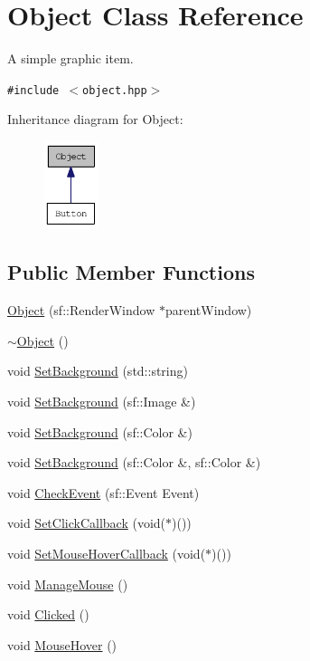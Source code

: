 \hypertarget{classObject}{
\section{Object Class Reference}
\label{classObject}
}
A simple graphic item.  


{\tt \#include $<$object.hpp$>$}

Inheritance diagram for Object:\nopagebreak
\begin{figure}[H]
\begin{center}
\leavevmode
\includegraphics[width=46pt]{classObject__inherit__graph}
\end{center}
\end{figure}
\subsection*{Public Member Functions}
\begin{CompactItemize}
\item 
\hyperlink{classObject_cefe027e1cec4c9de78b851bb42e2e66}{Object} (sf::RenderWindow $\ast$parentWindow)
\item 
\hyperlink{classObject_e8f5483f459e46687bd01e6f9977afd3}{$\sim$Object} ()
\item 
void \hyperlink{classObject_8e374c70b7dbaa03b2a3180490789d1d}{SetBackground} (std::string)
\item 
void \hyperlink{classObject_00d4be2d8b013240b29e50ca7599fe55}{SetBackground} (sf::Image \&)
\item 
void \hyperlink{classObject_aa81f5ed57ee0bca860654241a16e325}{SetBackground} (sf::Color \&)
\item 
void \hyperlink{classObject_1abd4bc0011cb25fe9ed940e554d6cbb}{SetBackground} (sf::Color \&, sf::Color \&)
\item 
void \hyperlink{classObject_b68977125b45e872852613463037cebb}{CheckEvent} (sf::Event Event)
\item 
void \hyperlink{classObject_68e5f5f024cf7f2db43bd2de010c118c}{SetClickCallback} (void($\ast$)())
\item 
void \hyperlink{classObject_82e1ba70ec0e2b9327af29764cd666eb}{SetMouseHoverCallback} (void($\ast$)())
\item 
void \hyperlink{classObject_d353628cfc37903c31e07f9179c7407f}{ManageMouse} ()
\item 
void \hyperlink{classObject_8342d588d9294226206106e142c30e51}{Clicked} ()
\item 
void \hyperlink{classObject_d3669e5b85439868eb7738f6d5a409ef}{MouseHover} ()
\end{CompactItemize}
